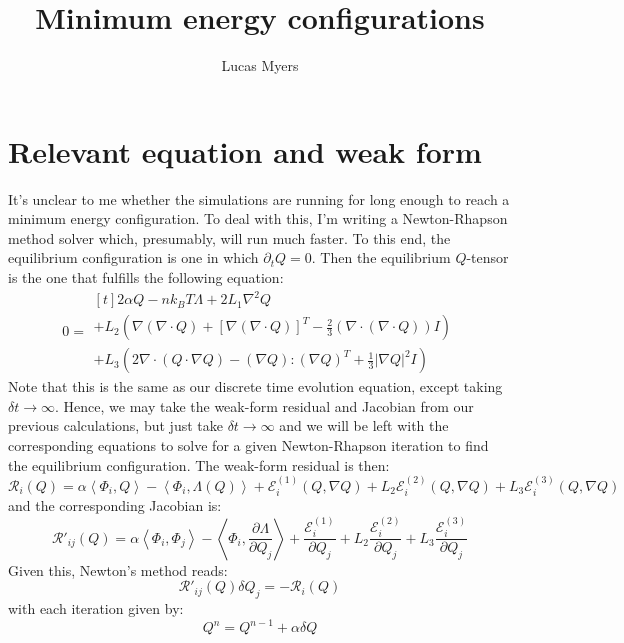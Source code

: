 \documentclass[reqno]{article}
\begin{document}
\title{Minimum energy configurations}
\author{Lucas Myers}
\maketitle

\section{Relevant equation and weak form}
It's unclear to me whether the simulations are running for long enough to reach a minimum energy configuration.
To deal with this, I'm writing a Newton-Rhapson method solver which, presumably, will run much faster.
To this end, the equilibrium configuration is one in which $\partial_t Q = 0$.
Then the equilibrium $Q$-tensor is the one that fulfills the following equation:
\begin{equation}
    0
    =
    \begin{multlined}[t]
      2 \alpha Q - n k_B T \Lambda + 2 L_1 \nabla^2 Q \\
      + L_2 \left(
        \nabla \left( \nabla \cdot Q \right)
        + \left[ \nabla \left( \nabla \cdot Q \right) \right]^T
        - \tfrac23 \left( \nabla \cdot \left( \nabla \cdot Q \right) \right) I
      \right) \\
      + L_3 \left(
        2 \nabla \cdot \left( Q \cdot \nabla Q \right)
        - \left( \nabla Q \right) : \left( \nabla Q \right)^T
        + \tfrac13 \left| \nabla Q \right|^2 I
      \right)
    \end{multlined}
\end{equation}
Note that this is the same as our discrete time evolution equation, except taking $\delta t \to \infty$.
Hence, we may take the weak-form residual and Jacobian from our previous calculations, but just take $\delta t \to \infty$ and we will be left with the corresponding equations to solve for a given Newton-Rhapson iteration to find the equilibrium configuration.
The weak-form residual is then:
\begin{equation}
    \mathcal{R}_i(Q)
    =
    \alpha \left<\Phi_i, Q\right>
    - \left<\Phi_i, \Lambda(Q) \right>
    + \mathcal{E}^{(1)}_i (Q, \nabla Q)
    + L_2 \mathcal{E}^{(2)}_i (Q, \nabla Q)
    + L_3 \mathcal{E}^{(3)}_i (Q, \nabla Q)
\end{equation}
and the corresponding Jacobian is:
\begin{equation}
    \mathcal{R}'_{ij}(Q)
    =
    \alpha \left<\Phi_i, \Phi_j\right>
    - \left<\Phi_i, \frac{\partial \Lambda}{\partial Q_j} \right>
    + \frac{\mathcal{E}^{(1)}_i}{\partial Q_j}
    + L_2 \frac{\mathcal{E}^{(2)}_i}{\partial Q_j}
    + L_3 \frac{\mathcal{E}^{(3)}_i}{\partial Q_j}
\end{equation}
Given this, Newton's method reads:
\begin{equation}
    \mathcal{R}'_{ij}(Q) \delta Q_j
    =
    -\mathcal{R}_i(Q)
\end{equation}
with each iteration given by:
\begin{equation}
    Q^n = Q^{n - 1} + \alpha \delta Q
\end{equation}
\end{document}
